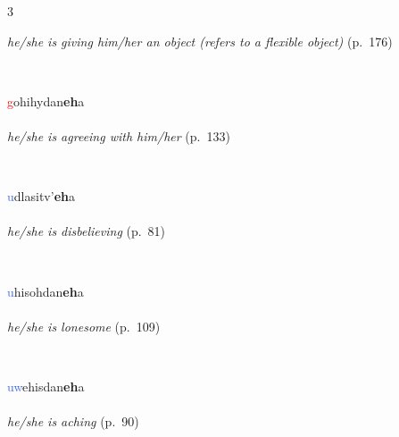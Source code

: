 \documentclass[oneside,openany]{book}%
\begin{document}
\begin{multicols}{3}
\begin{minipage}[t]{\linewidth}
\noindent \textit{he/she is giving him/her an object (refers to a flexible object)} (p.~176)
\end{minipage}\\[1em]%
\begin{minipage}[t]{\linewidth}
\raggedright\noindent \textcolor{Red}{g}ohihydan\textbf{eh}a\\
\\
\noindent \textit{he/she is agreeing with him/her} (p.~133)
\end{minipage}\\[1em]%
\begin{minipage}[t]{\linewidth}
\raggedright\noindent \textcolor{RoyalBlue}{u}dlasitv'\textbf{eh}a\\
\\
\noindent \textit{he/she is disbelieving} (p.~81)
\end{minipage}\\[1em]%
\begin{minipage}[t]{\linewidth}
\raggedright\noindent \textcolor{RoyalBlue}{u}hisohdan\textbf{eh}a\\
\\
\noindent \textit{he/she is lonesome} (p.~109)
\end{minipage}\\[1em]%
\begin{minipage}[t]{\linewidth}
\raggedright\noindent \textcolor{RoyalBlue}{uw}ehisdan\textbf{eh}a\\
\\
\noindent \textit{he/she is aching} (p.~90)
\end{minipage}\\[1em]%
\end{multicols}%
\vspace{1em}%
\needspace{1.5in}%
\end{document}
